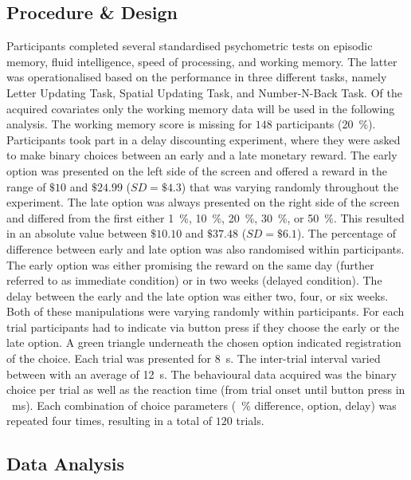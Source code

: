 		\subsection{Procedure \& Design}
		Participants completed several standardised psychometric tests on episodic memory, fluid intelligence, speed of processing, and working memory. The latter was operationalised based on the performance in three different tasks, namely Letter Updating Task, Spatial Updating Task, and Number-N-Back Task. Of the acquired covariates only the working memory data will be used in the following analysis.
		The working memory score is missing for $148$ participants (\SI{20}{\percent}). \\ %
		Participants took part in a delay discounting experiment, where they were asked to make binary choices between an early and a late monetary reward. 
		The early option was presented on the left side of the screen and offered a reward in the range of $\$10$ and $\$24.99$ ($SD = \$4.3$) that was varying randomly throughout the experiment. The late option was always presented on the right side of the screen and differed from the first either \SI{1}{\percent}, \SI{10}{\percent}, \SI{20}{\percent}, \SI{30}{\percent}, or \SI{50}{\percent}. This resulted in an absolute value between $\$10.10$ and $\$37.48$ ($SD = \$6.1$). The percentage of difference between early and late option was also randomised within participants.
		The early option was either promising the reward on the same day (further referred to as immediate condition) or in two weeks (delayed condition). The delay between the early and the late option was either two, four, or six weeks. Both of these manipulations were varying randomly within participants.
		For each trial participants had to indicate via button press if they choose the early or the late option. A green triangle underneath the chosen option indicated registration of the choice. Each trial was presented for \SI{8}{\second}. The inter-trial interval varied between with an average of \SI{12}{\second}.
		The behavioural data acquired was the binary choice per trial as well as the reaction time (from trial onset until button press in \SI{}{\milli\second}). 
		Each combination of choice parameters (\SI{}{\percent} difference, option, delay) was repeated four times, resulting in a total of $120$ trials.


		\subsection{Data Analysis}
		
